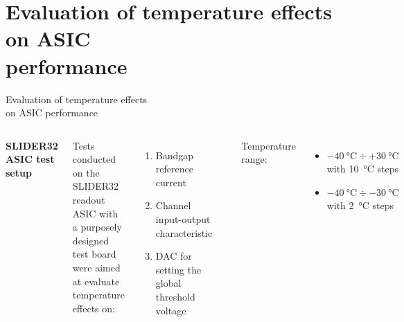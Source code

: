 \documentclass[aspectratio=169,xcolor=dvipsnames]{beamer}
\begin{document}

\section{Evaluation of temperature effects on ASIC\\ \vskip-0.15cm performance}

\begin{frame}{Evaluation of temperature effects \\ \vskip-0.15cm on ASIC performance}
\fontsize{8.5pt}{1}\selectfont
    \begin{columns}[T]
        \vskip0.3cm
        \textbf{SLIDER32 ASIC test setup}\\
        \vskip0.15cm
        
        Tests conducted on the SLIDER32 readout ASIC with a purposely designed test board were aimed at evaluate temperature effects on:
        \begin{enumerate}
            \item Bandgap reference current
            \item Channel input-output characteristic
            \item DAC for setting the global threshold voltage
        \end{enumerate}

        \vskip0.05cm
        \includegraphics[width=0.95\textwidth]{images/temperature_effects/test_setup_test_board_csavrefgm_530mv.png}
        \vskip0.2cm

        Temperature range: 
        \begin{itemize}
            \item $\SI{-40}{\celsius} \div +\SI{30}{\celsius}$ with \SI{10}{\celsius} steps
            \item $\SI{-40}{\celsius} \div \SI{-30}{\celsius}$ with \SI{2}{\celsius} steps
        \end{itemize}


\end{columns}
\end{frame}
\end{document}
